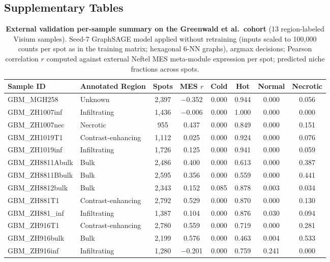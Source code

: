 \documentclass[11pt,letterpaper]{article}
\begin{document}
\clearpage
\subsection*{Supplementary Tables}


\begin{table}[H]
\centering
\caption{\textbf{External validation per-sample summary on the Greenwald et al.\ cohort} (13 region-labeled Visium samples). Seed-7 GraphSAGE model applied without retraining (inputs scaled to 100{,}000 counts per spot as in the training matrix; hexagonal 6-NN graphs), argmax decisions; Pearson correlation $r$ computed against external Neftel MES meta-module expression per spot; predicted niche fractions across spots.}
\label{tab:s1}
\footnotesize
\setlength{\tabcolsep}{4pt}
\begin{tabular}{llcccccc}
\toprule
\textbf{Sample ID} & \textbf{Annotated Region} & \textbf{Spots} & \textbf{MES $r$} & \textbf{Cold} & \textbf{Hot} & \textbf{Normal} & \textbf{Necrotic} \\
\midrule
GBM\_MGH258 & Unknown & 2{,}397 & $-$0.352 & 0.000 & 0.944 & 0.000 & 0.056 \\
GBM\_ZH1007inf & Infiltrating & 1{,}436 & $-$0.006 & 0.000 & 1.000 & 0.000 & 0.000 \\
GBM\_ZH1007nec & Necrotic & 955 & 0.437 & 0.000 & 0.849 & 0.000 & 0.151 \\
GBM\_ZH1019T1 & Contrast-enhancing & 1{,}112 & 0.025 & 0.000 & 0.924 & 0.000 & 0.076 \\
GBM\_ZH1019inf & Infiltrating & 1{,}726 & 0.125 & 0.000 & 0.941 & 0.000 & 0.059 \\
GBM\_ZH8811Abulk & Bulk & 2{,}486 & 0.400 & 0.000 & 0.613 & 0.000 & 0.387 \\
GBM\_ZH8811Bbulk & Bulk & 2{,}595 & 0.356 & 0.000 & 0.559 & 0.000 & 0.441 \\
GBM\_ZH8812bulk & Bulk & 2{,}343 & 0.152 & 0.085 & 0.878 & 0.003 & 0.034 \\
GBM\_ZH881T1 & Contrast-enhancing & 2{,}792 & 0.529 & 0.000 & 0.870 & 0.000 & 0.130 \\
GBM\_ZH881\_inf & Infiltrating & 1{,}387 & 0.104 & 0.000 & 0.876 & 0.030 & 0.094 \\
GBM\_ZH916T1 & Contrast-enhancing & 2{,}780 & 0.559 & 0.000 & 0.719 & 0.000 & 0.281 \\
GBM\_ZH916bulk & Bulk & 2{,}199 & 0.576 & 0.000 & 0.463 & 0.004 & 0.533 \\
GBM\_ZH916inf & Infiltrating & 1{,}280 & $-$0.201 & 0.000 & 0.759 & 0.241 & 0.000 \\
\bottomrule
\end{tabular}
\end{table}
\end{document}
